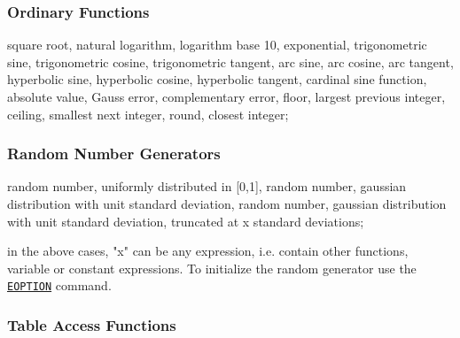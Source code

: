 \subsubsection{Ordinary Functions}
\label{subsubsec:function}

\begin{madlist}
   square root, 
    natural logarithm, 
   logarithm base 10, 
   exponential, 
   trigonometric sine, 
   trigonometric cosine, 
   trigonometric tangent, 
   arc sine, 
   arc cosine, 
   arc tangent, 
   hyperbolic sine, 
   hyperbolic cosine, 
   hyperbolic tangent, 
   cardinal sine function,
   absolute value, 
   Gauss error,
   complementary error,
   floor, largest previous integer,
   ceiling, smallest next integer,
   round, closest integer;
\end{madlist}

\subsubsection{Random Number Generators}
\label{subsubsec:random}
\begin{madlist}
   random number, uniformly distributed in [0,1], 
   random number, gaussian distribution with unit
  standard deviation,  
   random number, gaussian distribution with unit
  standard deviation, truncated at x standard deviations;  
\end{madlist}

in the above cases, "x" can be any expression, i.e. contain other
functions, variable or constant expressions. To initialize the \madx
random generator use the \hyperref[sec:eoption]{\texttt{EOPTION}} command.

\subsubsection{Table Access Functions}
\label{subsubsec:table}

